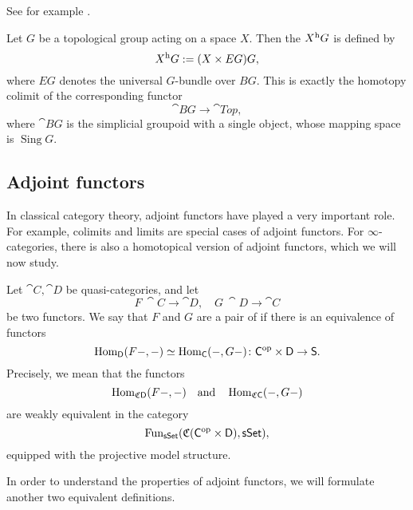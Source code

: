 See for example \cite{riehl}.

\begin{example}
    Let $G$ be a topological group acting on a space $X$.
    Then the  $X\/{}^{\mathrm h}G$ is defined by 
    \[ X\/{}^{\mathrm h}G:=(X\times EG)\/G, \]
    where $EG$ denotes the universal $G$-bundle over $BG$.
    This is exactly the homotopy colimit of the corresponding functor 
    \[ \cat{B}G\to\cat{Top}, \]
    where $\cat BG$ is the simplicial groupoid with a single object,
    whose mapping space is $\operatorname{Sing}G$. \varqed
\end{example}

\subsection{Adjoint functors}

In classical category theory,
adjoint functors have played a very important role.
For example, colimits and limits are special cases of adjoint functors.
For $\infty$-categories,
there is also a homotopical version of adjoint functors,
which we will now study.

\begin{definition}
    Let $\cat C,\cat D$ be quasi-categories, and let 
    \[ F\:\cat C\to\cat D,\quad G\:\cat D\to\cat C \]    
    be two functors. We say that $F$ and $G$ are a pair of 
     if there is an equivalence of functors 
    \[ \operatorname{Hom}_{\mathsf{D}}(F-,-)\simeq\operatorname{Hom}_{\mathsf{C}}(-,G-)\colon\mathsf{C}^{\mathrm{op}}\times\mathsf{D}\to\mathsf{S}. \]
    Precisely, we mean that the functors
    \[ \operatorname{Hom}_{\mathfrak C\mathsf{D}}(F-,-)\quad\text{and}\quad\operatorname{Hom}_{\mathfrak C\mathsf{C}}(-,G-) \]
    are weakly equivalent in the category 
    \[ \operatorname{Fun}_{\mathsf{sSet}}(\mathfrak C(\mathsf{C}^{\mathrm{op}}\times\mathsf{D}),\mathsf{sSet}), \]
    equipped with the projective model structure.
\end{definition}

In order to understand the properties of adjoint functors,
we will formulate another two equivalent definitions.


